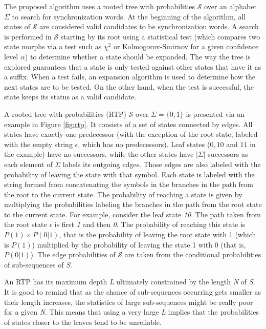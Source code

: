 {The proposed algorithm uses a rooted tree with probabilities $\mathcal{S}$ over an alphabet $\Sigma$ to search for synchronization words. At the beginning of the algorithm, all states of $\mathcal{S}$ are considered valid candidates to be synchronization words. A search is performed in $\mathcal{S}$ starting by its root using a statistical test (which compares two state morphs via a test such as $\chi^2$ or Kolmogorov-Smirnov for a given confidence level $\alpha$) to determine whether a state should be expanded. The way the tree is explored guarantees that a state is only tested against other states that have it as a suffix. When a test fails, an expansion algorithm is used to determine how the next states are to be tested. On the other hand, when the test is successful, the state keeps its status as a valid candidate.

A rooted tree with probabilities (RTP) $\mathcal{S}$ over $\Sigma = \{0, 1\}$ is presented via an example in Figure \ref{fig:rtp}. It consists of a set of states connected by edges. All states have exactly one predecessor (with the exception of the root state, labeled with the empty string $\epsilon$, which has no predecessors). Leaf states ($0, 10$ and $11$ in the example) have no successors, while the other states have $|\Sigma|$ successors as each element of $\Sigma$ labels its outgoing edges. Those edges are also labeled with the probability of leaving the state with that symbol. Each state is labeled with the string formed from concatenating the symbols in the branches in the path from the root to the current state. The probability of reaching a state is given by multiplying the probabilities labeling the branches in the path from the root state to the current state. For example, consider the leaf state \textit{10}. The path taken from the root state $\epsilon$ is first \textit{1} and then \textit{0}. The probability of reaching this state is $P(1)\times P(0|1)$, that is the probability of leaving the root state with 1 (which is $P(1)$) multiplied by the probability of leaving the state 1 with 0 (that is, $P(0|1)$). The edge probabilities of $\mathcal{S}$ are taken from the conditional probabilities of sub-sequences of \textit{S}.

An RTP has its maximum depth \textit{L} ultimately constrained by the length \textit{N} of \textit{S}. It is good to remind that as the chance of sub-sequences occurring gets smaller as their length increases, the statistics of large sub-sequences might be really poor for a given \textit{N}. This means that using a very large \textit{L} implies that the probabilities of states closer to the leaves tend to be unreliable.

}
